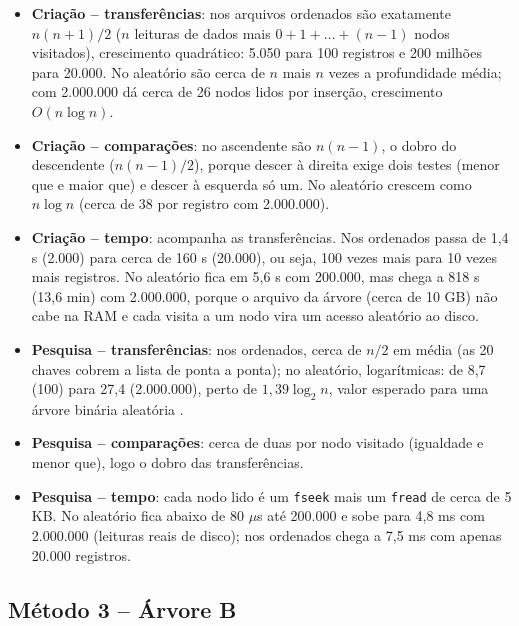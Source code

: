 \documentclass{article}
\begin{document}
\begin{itemize}
    \item \textbf{Criação -- transferências}: nos arquivos ordenados são exatamente $n(n+1)/2$ ($n$ leituras de dados mais $0 + 1 + \dots + (n-1)$ nodos visitados), crescimento quadrático: 5.050 para 100 registros e 200 milhões para 20.000. No aleatório são cerca de $n$ mais $n$ vezes a profundidade média; com 2.000.000 dá cerca de 26 nodos lidos por inserção, crescimento $O(n \log n)$.
    \item \textbf{Criação -- comparações}: no ascendente são $n(n-1)$, o dobro do descendente ($n(n-1)/2$), porque descer à direita exige dois testes (menor que e maior que) e descer à esquerda só um. No aleatório crescem como $n \log n$ (cerca de 38 por registro com 2.000.000).
    \item \textbf{Criação -- tempo}: acompanha as transferências. Nos ordenados passa de 1,4 s (2.000) para cerca de 160 s (20.000), ou seja, 100 vezes mais para 10 vezes mais registros. No aleatório fica em 5,6 s com 200.000, mas chega a 818 s (13,6 min) com 2.000.000, porque o arquivo da árvore (cerca de 10 GB) não cabe na RAM e cada visita a um nodo vira um acesso aleatório ao disco.
    \item \textbf{Pesquisa -- transferências}: nos ordenados, cerca de $n/2$ em média (as 20 chaves cobrem a lista de ponta a ponta); no aleatório, logarítmicas: de 8,7 (100) para 27,4 (2.000.000), perto de $1{,}39 \log_2 n$, valor esperado para uma árvore binária aleatória \cite{knuth1998}.
    \item \textbf{Pesquisa -- comparações}: cerca de duas por nodo visitado (igualdade e menor que), logo o dobro das transferências.
    \item \textbf{Pesquisa -- tempo}: cada nodo lido é um \texttt{fseek} mais um \texttt{fread} de cerca de 5 KB. No aleatório fica abaixo de 80 $\mu$s até 200.000 e sobe para 4,8 ms com 2.000.000 (leituras reais de disco); nos ordenados chega a 7,5 ms com apenas 20.000 registros.
\end{itemize}

\subsection{Método 3 -- Árvore B}
\end{document}
